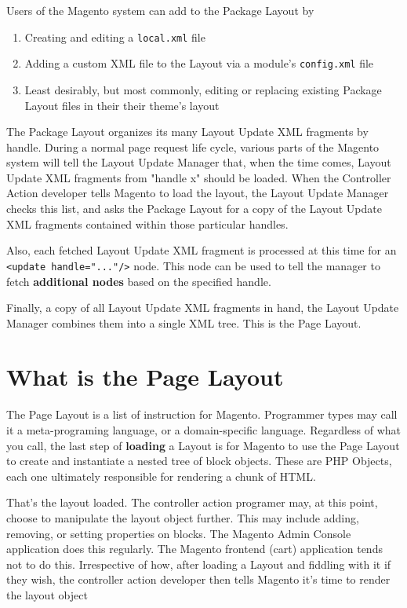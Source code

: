 \documentclass[oneside]{book}
\begin{document}
Users of the Magento system can add to the Package Layout by 

\begin{enumerate}
\item Creating and editing a \footnotesize\texttt{local.xml} \normalsize  file
\item Adding a custom XML file to the Layout via a module's \footnotesize\texttt{config.xml} \normalsize  file
\item Least desirably, but most commonly, editing or replacing existing Package Layout files in their their theme's layout
\end{enumerate}


The Package Layout organizes its many Layout Update XML fragments by handle.    During a normal page request life cycle, various parts of the Magento system will tell the Layout Update Manager that, when the time comes, Layout Update XML fragments from "handle x" should be loaded.  When the Controller Action developer tells Magento to load the layout, the Layout Update Manager checks this list, and asks the Package Layout for a copy of the Layout Update XML fragments contained within those particular handles.

Also, each fetched Layout Update XML fragment is processed at this time for an \footnotesize\texttt{\textless update handle="..."/\textgreater } \normalsize  node.  This node can be used to tell the manager to fetch \textbf{additional nodes} based on the specified handle. 

Finally, a copy of all Layout Update XML fragments in hand, the Layout Update Manager combines them into a single XML tree.   This is the Page Layout.

\section{What is the Page Layout}

The Page Layout is a list of instruction for Magento.  Programmer types may call it a meta-programing language, or a domain-specific language.  Regardless of what you call, the last step of \textbf{loading} a Layout is for Magento to use the Page Layout to create and instantiate a nested tree of block objects.  These are PHP Objects, each one ultimately responsible for rendering a chunk of HTML.

That's the layout loaded.  The controller action programer may, at this point, choose to manipulate the layout object further.  This may include adding, removing, or setting properties on blocks.  The Magento Admin Console application does this regularly.  The Magento frontend (cart) application tends not to do this.  Irrespective of how, after loading a Layout and fiddling with it if they wish, the controller action developer then tells Magento it's time to render the layout object
\end{document}
